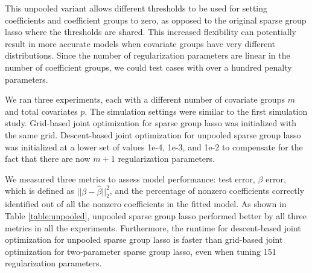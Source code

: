\documentclass[10pt,letterpaper]{article}
\begin{document}
This unpooled variant allows different thresholds to be used for setting coefficients and coefficient groups to zero, as opposed to the original sparse group lasso where the thresholds are shared. This increased flexibility can potentially result in more accurate models when covariate groups have very different distributions. Since the number of regularization parameters are linear in the number of coefficient groups, we could test cases with over a hundred penalty parameters.

We ran three experiments, each with a different number of covariate groups $m$ and total covariates $p$. The simulation settings were similar to the first simulation study. Grid-based joint optimization for sparse group lasso was initialized with the same grid. Descent-based joint optimization for unpooled sparse group lasso was initialized at a lower set of values 1e-4, 1e-3, and 1e-2 to compensate for the fact that there are now $m + 1$ regularization parameters.

We measured three metrics to assess model performance: test error, $\beta$ error, which is defined as $\lvert \lvert \beta - \hat \beta \rvert \rvert_2 ^2$, and the percentage of nonzero coefficients correctly identified out of all the nonzero coefficients in the fitted model. As shown in Table \ref{table:unpooled}, unpooled sparse group lasso performed better by all three metrics in all the experiments. Furthermore, the runtime for descent-based joint optimization for unpooled sparse group lasso is faster than grid-based joint optimization for two-parameter sparse group lasso, even when tuning 151 regularization parameters.
\end{document}
